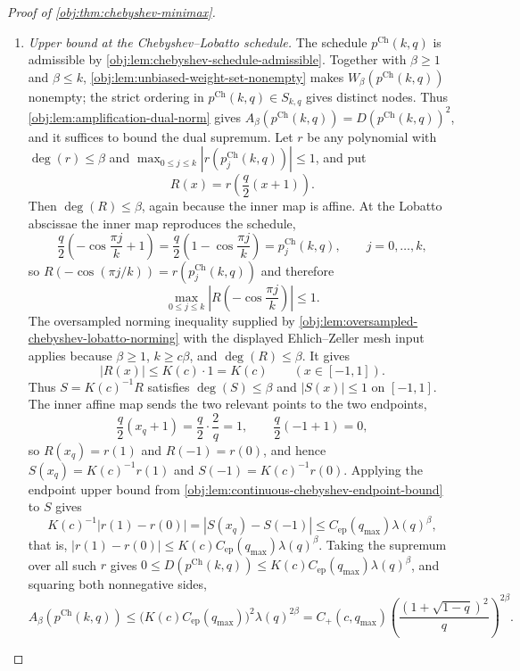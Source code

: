 \begin{proof}[Proof of \cref{obj:thm:chebyshev-minimax}]
\begin{enumerate}
\item \emph{Upper bound at the Chebyshev--Lobatto schedule.}
The schedule \(p^{\mathrm{Ch}}(k,q)\) is admissible by \cref{obj:lem:chebyshev-schedule-admissible}. Together with \(\beta\ge1\) and \(\beta\le k\), \cref{obj:lem:unbiased-weight-set-nonempty} makes \(W_\beta(p^{\mathrm{Ch}}(k,q))\) nonempty; the strict ordering in \(p^{\mathrm{Ch}}(k,q)\in S_{k,q}\) gives distinct nodes. Thus \cref{obj:lem:amplification-dual-norm} gives
\(A_\beta(p^{\mathrm{Ch}}(k,q))=D(p^{\mathrm{Ch}}(k,q))^2\), and it suffices to bound the dual supremum. Let \(r\) be
any polynomial with \(\deg(r)\le\beta\) and
\(\max_{0\le j\le k} |r(p^{\mathrm{Ch}}_j(k,q))|\le1\), and put
\[
R(x)=r\!\left(\frac q2(x+1)\right).
\]
Then \(\deg(R)\le\beta\), again because the inner map is affine. %
At the Lobatto abscissae the inner map reproduces the schedule,
\[
\frac q2\left(-\cos\frac{\pi j}{k}+1\right)
=
\frac q2\left(1-\cos\frac{\pi j}{k}\right)
=
p^{\mathrm{Ch}}_j(k,q),
\qquad j=0,\ldots,k,
\]
so \(R(-\cos(\pi j/k))=r(p^{\mathrm{Ch}}_j(k,q))\) and therefore
\[
\max_{0\le j\le k}\left|R\!\left(-\cos\frac{\pi j}{k}\right)\right|\le1 .
\]
The oversampled norming inequality supplied by \cref{obj:lem:oversampled-chebyshev-lobatto-norming} with the displayed Ehlich--Zeller mesh input applies because \(\beta\ge1\), \(k\ge c\beta\), and \(\deg(R)\le\beta\). It gives
\[
|R(x)|\le K(c)\cdot 1=K(c)\qquad (x\in[-1,1]).
\]
Thus \(S=K(c)^{-1}R\) satisfies \(\deg(S)\le\beta\) and \(|S(x)|\le1\) on \([-1,1]\). The inner affine map sends the two relevant points to the two endpoints,
\[
\frac q2\left(x_q+1\right)=\frac q2\cdot\frac2q=1,
\qquad
\frac q2\left(-1+1\right)=0,
\]
so \(R(x_q)=r(1)\) and \(R(-1)=r(0)\), and hence \(S(x_q)=K(c)^{-1}r(1)\) and \(S(-1)=K(c)^{-1}r(0)\). Applying the endpoint upper bound from
\cref{obj:lem:continuous-chebyshev-endpoint-bound} to \(S\) gives
\[
K(c)^{-1}|r(1)-r(0)|
=
|S(x_q)-S(-1)|
\le C_{\mathrm{ep}}(q_{\max})\lambda(q)^\beta,
\]
that is, \(|r(1)-r(0)|\le K(c)C_{\mathrm{ep}}(q_{\max})\lambda(q)^\beta\). Taking the supremum over all such \(r\) gives
\(0\le D(p^{\mathrm{Ch}}(k,q))\le K(c)C_{\mathrm{ep}}(q_{\max})\lambda(q)^\beta\), and squaring both nonnegative sides,
\[
A_\beta\!\left(p^{\mathrm{Ch}}(k,q)\right)
\le
\bigl(K(c)C_{\mathrm{ep}}(q_{\max})\bigr)^2\lambda(q)^{2\beta}
=
C_+(c,q_{\max})
\left(\frac{(1+\sqrt{1-q})^2}{q}\right)^{2\beta}.
\]


\end{enumerate}
\end{proof}
